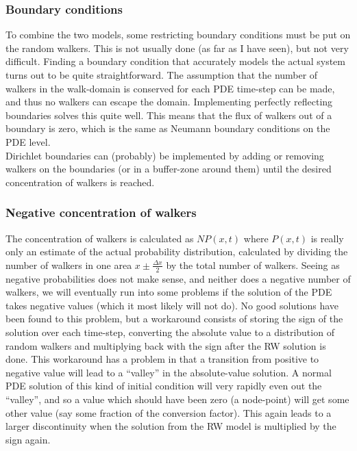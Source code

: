 \subsubsection{Boundary conditions}
 To combine the two models, some restricting boundary conditions must be put on the random walkers. 
 This is not usually done (as far as I have seen), but not very difficult. 
 Finding a boundary condition that accurately models the actual system turns out to be quite straightforward.
 The assumption that the number of walkers in the walk-domain is conserved for each PDE time-step can be made, and thus no walkers can escape the domain. 
 Implementing perfectly reflecting boundaries solves this quite well. 
 This means that the flux of walkers out of a boundary is zero, which is the same as Neumann boundary conditions on the PDE level. \\
 Dirichlet boundaries can (probably) be implemented by adding or removing walkers on the boundaries (or in a buffer-zone around them) until the desired concentration of walkers is reached.
 
\subsubsection{Negative concentration of walkers}
 The concentration of walkers is calculated as $NP(x,t)$ where $P(x,t)$ is really only an estimate of the actual probability distribution, calculated by dividing the number of walkers in one area $x\pm\frac{\Delta x}{2}$ by the total number of walkers. 
 Seeing as negative probabilities does not make sense, and neither does a negative number of walkers, we will eventually run into some problems if the solution of the PDE takes negative values (which it most likely will not do). 
 No good solutions have been found to this problem, but a workaround consists of storing the sign of the solution over each time-step, converting the absolute value to a distribution of random walkers and multiplying back with the sign after the RW solution is done. 
 This workaround has a problem in that a transition from positive to negative value will lead to a ``valley'' in the absolute-value solution. 
 A normal PDE solution of this kind of initial condition will very rapidly even out the ``valley'', and so a value which should have been zero (a node-point) will get some other value (say some fraction of the conversion factor). This again leads to a larger discontinuity when the solution from the RW model is multiplied by the sign again.

